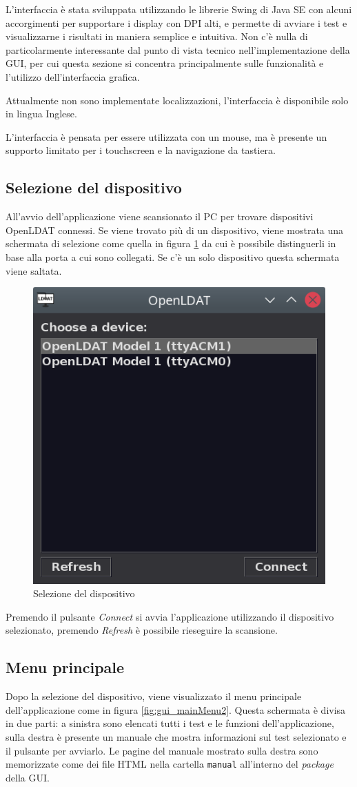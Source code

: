 L'interfaccia è stata sviluppata utilizzando le librerie Swing di Java SE con alcuni accorgimenti per supportare i display con DPI alti, e permette di avviare i test e visualizzarne i risultati in maniera semplice e intuitiva. Non c'è nulla di particolarmente interessante dal punto di vista tecnico nell'implementazione della GUI, per cui questa sezione si concentra principalmente sulle funzionalità e l'utilizzo dell'interfaccia grafica.

Attualmente non sono implementate localizzazioni, l'interfaccia è disponibile solo in lingua Inglese.

L'interfaccia è pensata per essere utilizzata con un mouse, ma è presente un supporto limitato per i touchscreen e la navigazione da tastiera.

\subsection{Selezione del dispositivo}
All'avvio dell'applicazione viene scansionato il PC per trovare dispositivi OpenLDAT connessi. Se viene trovato più di un dispositivo, viene mostrata una schermata di selezione come quella in figura \ref{fig:gui_deviceSelector} da cui è possibile distinguerli in base alla porta a cui sono collegati. Se c'è un solo dispositivo questa schermata viene saltata.

\begin{figure}[h]
	\centering
	\includegraphics[width=.5\textwidth]{Applicazione_files/gui_deviceSelector.png}
	\caption{Selezione del dispositivo}
	\label{fig:gui_deviceSelector}
\end{figure}

Premendo il pulsante \textit{Connect} si avvia l'applicazione utilizzando il dispositivo selezionato, premendo \textit{Refresh} è possibile rieseguire la scansione.

\subsection{Menu principale}
Dopo la selezione del dispositivo, viene visualizzato il menu principale dell'applicazione come in figura \ref{fig:gui_mainMenu2}. Questa schermata è divisa in due parti: a sinistra sono elencati tutti i test e le funzioni dell'applicazione, sulla destra è presente un manuale che mostra informazioni sul test selezionato e il pulsante per avviarlo. Le pagine del manuale mostrato sulla destra sono memorizzate come dei file HTML nella cartella \texttt{manual} all'interno del \textit{package} della GUI.

